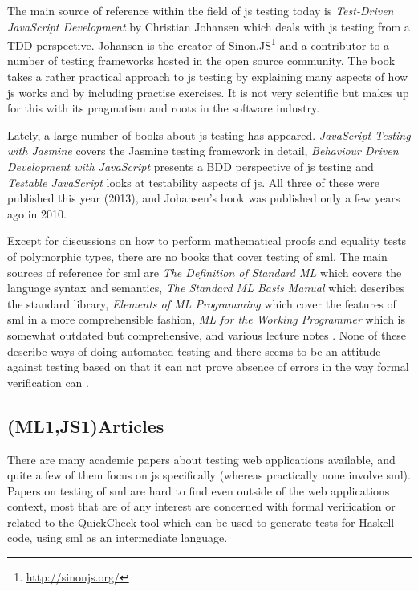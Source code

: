 \documentclass[11pt]{article}
\begin{document}
The main source of reference within the field of \gls{js} testing today is \emph{Test-Driven JavaScript Development} \cite{Tddjs} by Christian Johansen which deals with \gls{js} testing from a TDD perspective. Johansen is the creator of Sinon.JS\footnote{\url{http://sinonjs.org/}} and a contributor to a number of testing frameworks hosted in the open source community. The book takes a rather practical approach to \gls{js} testing by explaining many aspects of how \gls{js} works and by including practise exercises. It is not very scientific but makes up for this with its pragmatism and roots in the software industry.

Lately, a large number of books about \gls{js} testing has appeared. \emph{JavaScript Testing with Jasmine} \cite{JasmineBook} covers the Jasmine testing framework in detail, \emph{Behaviour Driven Development with JavaScript} \cite{BDDJS} presents a BDD perspective of \gls{js} testing and \emph{Testable JavaScript} \cite{TestableJS} looks at testability aspects of \gls{js}. All three of these were published this year (2013), and Johansen's book was published only a few years ago in 2010.

Except for discussions on how to perform mathematical proofs and equality tests of polymorphic types, there are no books that cover testing of \gls{sml}. The main sources of reference for \gls{sml} are \emph{The Definition of Standard ML} \cite{DefinitionStandardML} which covers the language syntax and semantics, \emph{The Standard ML Basis Manual} \cite{BasisManual} which describes the standard library, \emph{Elements of ML Programming} \cite{ElementsML} which cover the features of \gls{sml} in a more comprehensible fashion, \emph{ML for the Working Programmer} \cite{WorkingProgrammer} which is somewhat outdated but comprehensive, and various lecture notes \cite{ProgSml97}\cite{ProgSmlHarper}\cite{FunctionalML}\cite{NotesSMLNJ}. None of these describe ways of doing automated testing and there seems to be an attitude against testing based on that it can not prove absence of errors in the way formal verification can \cite[p.~16]{ProgSmlHarper}.

\subsection{(ML1,JS1)Articles}

There are many academic papers about testing web applications available, and quite a few of them focus on \gls{js} specifically (whereas practically none involve \gls{sml}). Papers on testing of \gls{sml} are hard to find even outside of the web applications context, most that are of any interest are concerned with formal verification or related to the QuickCheck tool which can be used to generate tests for Haskell code, using \gls{sml} as an intermediate language.
\end{document}
